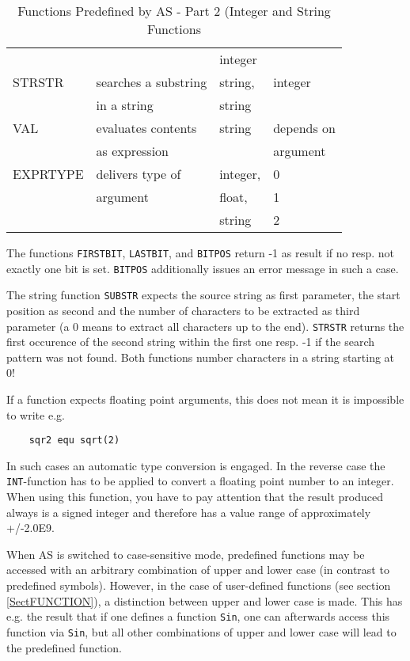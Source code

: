 \documentclass[12pt,twoside]{report}
\newcommand{\tty}[1]{{\tt #1}}
\begin{document}
\begin{table*}[htbp]
\begin{center}
\begin{tabular}{|l|l|l|l|}
         &                      & integer              & \\
STRSTR   & searches a substring & string,              & integer \\
         & in a string          & string               & \\
VAL      & evaluates contents   & string               & depends on \\
         & as expression        &                      & argument \\
EXPRTYPE & delivers type of     & integer,             & 0 \\
         & argument             & float,               & 1 \\
         &                      & string               & 2 \\
\hline
\end{tabular}\end{center}
\caption{Functions Predefined by AS - Part 2 (Integer and
         String Functions \label{TabFuncs2}}
\end{table*}
The functions \tty{FIRSTBIT}, \tty{LASTBIT}, and \tty{BITPOS} return -1 as
result if no resp. not exactly one bit is set.  \tty{BITPOS} additionally
issues an error message in such a case.

The string function \tty{SUBSTR} expects the source string as first
parameter, the start position as second and the number of characters to be
extracted as third parameter (a 0 means to extract all characters up to
the end).  \tty{STRSTR} returns the first occurence of the second string
within the first one resp. -1 if the search pattern was not found.  Both
functions number characters in a string starting at 0!

If a function expects floating point arguments, this does not mean it
is impossible to write e.g.
\begin{verbatim}
    sqr2 equ sqrt(2)
\end{verbatim}
In such cases an automatic type conversion is engaged. In the reverse
case the \tty{INT}-function has to be applied to convert a floating point
number to an integer.  When using this function, you have to pay
attention that the result produced always is a signed integer and
therefore has a value range of approximately +/-2.0E9.

When AS is switched to case-sensitive mode, predefined functions may be
accessed with an arbitrary combination of upper and lower case (in
contrast to predefined symbols).  However, in the case of user-defined
functions (see section \ref{SectFUNCTION}), a distinction between upper
and lower case is made.  This has e.g. the result that if one defines a
function \tty{Sin}, one can afterwards access this function via \tty{Sin}, but all
other combinations of upper and lower case will lead to the predefined
function.
\end{document}
